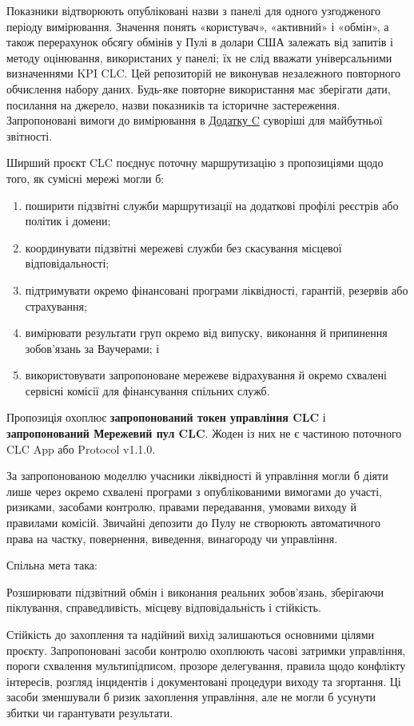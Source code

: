 \documentclass[11pt]{article}
\begin{document}
Показники відтворюють опубліковані назви з панелі для одного узгодженого періоду вимірювання. Значення понять «користувач», «активний» і «обмін», а також перерахунок обсягу обмінів у Пулі в долари США залежать від запитів і методу оцінювання, використаних у панелі; їх не слід вважати універсальними визначеннями KPI CLC. Цей репозиторій не виконував незалежного повторного обчислення набору даних. Будь-яке повторне використання має зберігати дати, посилання на джерело, назви показників та історичне застереження. Запропоновані вимоги до вимірювання в \href{https://docs.cosmolocal.credit/uk/white-paper/appendix-c-kpi-definitions}{Додатку C} суворіші для майбутньої звітності.

Ширший проєкт CLC поєднує поточну маршрутизацію з пропозиціями щодо того, як сумісні мережі могли б:

\begin{enumerate}[leftmargin=*]
\item поширити підзвітні служби маршрутизації на додаткові профілі реєстрів або політик і домени;
\item координувати підзвітні мережеві служби без скасування місцевої відповідальності;
\item підтримувати окремо фінансовані програми ліквідності, гарантій, резервів або страхування;
\item вимірювати результати груп окремо від випуску, виконання й припинення зобов'язань за Ваучерами; і
\item використовувати запропоноване мережеве відрахування й окремо схвалені сервісні комісії для фінансування спільних служб.
\end{enumerate}
Пропозиція охоплює \textbf{запропонований токен управління CLC} і \textbf{запропонований Мережевий пул CLC}. Жоден із них не є частиною поточного CLC App або Protocol v1.1.0.

За запропонованою моделлю учасники ліквідності й управління могли б діяти лише через окремо схвалені програми з опублікованими вимогами до участі, ризиками, засобами контролю, правами передавання, умовами виходу й правилами комісій. Звичайні депозити до Пулу не створюють автоматичного права на частку, повернення, виведення, винагороду чи управління.

Спільна мета така:

Розширювати підзвітний обмін і виконання реальних зобов'язань, зберігаючи піклування, справедливість, місцеву відповідальність і стійкість.

Стійкість до захоплення та надійний вихід залишаються основними цілями проєкту. Запропоновані засоби контролю охоплюють часові затримки управління, пороги схвалення мультипідписом, прозоре делегування, правила щодо конфлікту інтересів, розгляд інцидентів і документовані процедури виходу та згортання. Ці засоби зменшували б ризик захоплення управління, але не могли б усунути збитки чи гарантувати результати.
\end{document}
